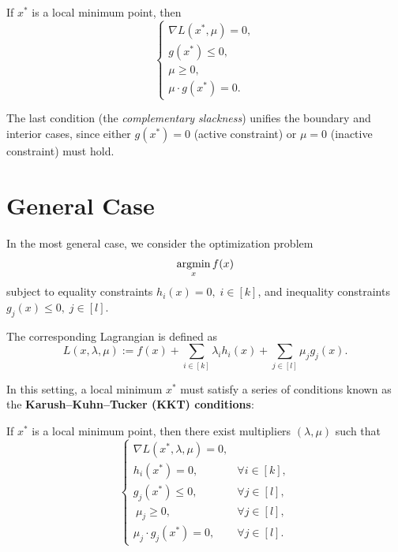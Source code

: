 \documentclass[../main]{subfiles}
\begin{document}
\begin{theorem}
    If $x^*$ is a local minimum point, then
    \begin{equation}
        \begin{cases}
            \nabla L(x^*, \mu) = 0, \\
            g(x^*) \leq 0, \\
            \mu \geq 0, \\
            \mu \cdot g(x^*) = 0.
        \end{cases}
    \end{equation}
\end{theorem}

The last condition (the \emph{complementary slackness}) unifies the boundary and interior cases, since either $g(x^*)=0$ (active constraint) or $\mu=0$ (inactive constraint) must hold.
\section{General Case}
In the most general case, we consider the optimization problem
\begin{equation}
    \mathop{\mathrm{argmin}}_x f(x)
\end{equation}
subject to equality constraints $h_i(x) = 0, \; i \in [k]$, and inequality constraints $g_j(x) \leq 0, \; j \in [l]$.  

The corresponding Lagrangian is defined as
\begin{equation}
    L(x, \lambda, \mu) := f(x) + \sum_{i \in [k]} \lambda_i h_i(x) + \sum_{j \in [l]} \mu_j g_j(x).
\end{equation}

In this setting, a local minimum $x^*$ must satisfy a series of conditions known as the \textbf{Karush--Kuhn--Tucker (KKT) conditions}:

\begin{theorem}
    If $x^*$ is a local minimum point, then there exist multipliers $(\lambda, \mu)$ such that
    \begin{equation}
        \begin{cases}
            \nabla L(x^*, \lambda, \mu) = 0, & \\
            h_i(x^*) = 0, & \forall i \in [k],  \\
            g_j(x^*) \leq 0, & \forall j \in [l], \\\
            \mu_j \geq 0, & \forall j \in [l], \\
            \mu_j \cdot g_j(x^*) = 0, & \forall j \in [l]. 
        \end{cases}
    \end{equation}
\end{theorem}
\end{document}
